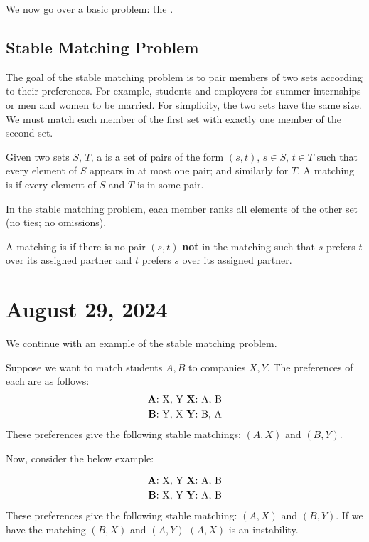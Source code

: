 \documentclass[12pt]{scrartcl}
\begin{document}
    We now go over a basic problem: the .

\subsection{Stable Matching Problem}
The goal of the stable matching problem is to pair members of two sets according to their preferences. For example, students and employers for summer internships or men and women to be married. For simplicity, the two sets have the same size. We must match each member of the first set with exactly one member of the second set.

\begin{definition}
    Given two sets $S$, $T$, a  is a set of pairs of the form $(s, t)$, $s \in S$, $t \in T$ such that every element of $S$ appears in at most one pair; and similarly for $T$. A matching is  if every element of $S$ and $T$ is in some pair.
\end{definition}

In the stable matching problem, each member ranks all elements of the other set (no ties; no omissions).

\begin{definition}
    A matching is  if there is no pair $(s, t)$ \textbf{not} in the matching such that $s$ prefers $t$ over its assigned partner and $t$ prefers $s$ over its assigned partner.
\end{definition}

\section{August 29, 2024}
We continue with an example of the stable matching problem.

\begin{example}
    Suppose we want to match students $A, B$ to companies $X, Y$. The preferences of each are as follows:
        \begin{align*}
            \text{\textbf{A}: X, Y} \ \text{\textbf{X}: A, B} \\
            \text{\textbf{B}: Y, X} \ \text{\textbf{Y}: B, A}
        \end{align*}
    These preferences give the following stable matchings: $(A, X)$ and $(B, Y)$.
\end{example}

Now, consider the below example:
    \begin{example}
        \begin{align*}
            \text{\textbf{A}: X, Y} \ \text{\textbf{X}: A, B} \\
            \text{\textbf{B}: X, Y} \ \text{\textbf{Y}: A, B}
        \end{align*}
    These preferences give the following stable matching: $(A, X)$ and $(B, Y)$. If we have the matching $(B, X)$ and $(A, Y)$ $(A, X)$ is an instability.
    \end{example}
\end{document}
